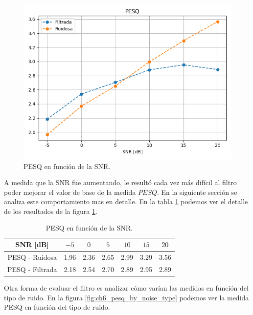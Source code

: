 \begin{figure}
	\centering
	\centerline{\includegraphics[scale=0.75]{images/ch6/pesq_by_snr.png}}
	\caption{PESQ en función de la SNR.}
	\label{fig:ch6_pesq_by_snr}
\end{figure}

A medida que la SNR fue aumentando, le resultó cada vez más difícil al filtro poder mejorar el valor de base de la medida $PESQ$. En la siguiente sección se analiza este comportamiento mas en detalle. En la tabla \ref{table:pesq_by_snr} podemos ver el detalle de los resultados de la figura \ref{fig:ch6_pesq_by_snr}.

\begin{table}
	\centering
	\begin{tabular}{ |c|c|c|c|c|c|c| } 
		\hline
		SNR [dB] & $-5$ & $0$ & $5$ & $10$ & $15$ & $20$ \\ 
		\hline
		PESQ - Ruidosa & 1.96 & 2.36 & 2.65 & 2.99 & 3.29 & 3.56 \\
		PESQ - Filtrada & 2.18 & 2.54 & 2.70 & 2.89 & 2.95 & 2.89 \\
		\hline
	\end{tabular}
	\caption{PESQ en función de la SNR.}
	\label{table:pesq_by_snr}
\end{table}


Otra forma de evaluar el filtro es analizar cómo varían las medidas en función del tipo de ruido. En la figura \ref{fig:ch6_pesq_by_noise_type} podemos ver la medida PESQ en función del tipo de ruido.

